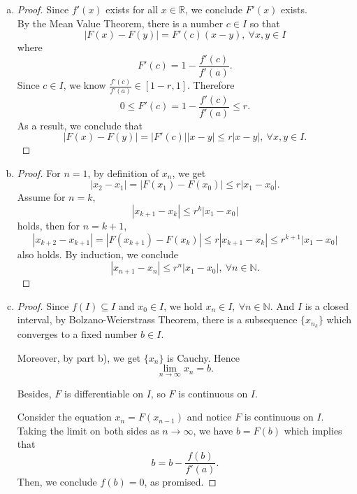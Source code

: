 \begin{Exercise}
\begin{enumerate}[a)]
\item 
\begin{proof}
Since $f'(x)$ exists for all $x \in \mathbb{R}$, we conclude $F'(x)$ exists. \\
By the Mean Value Theorem, there is a number $c \in I$ so that $$ |F(x)-F(y)| = F'(c)(x-y),\ \forall x,y \in I$$
where $$F'(c) = 1-\frac{f'(c)}{f'(a)}.$$
Since $c \in I$, we know $\frac{f'(c)}{f'(a)} \in [1-r,1]$. Therefore $$ 0 \leq F'(c) = 1-\frac{f'(c)}{f'(a)} \leq r.$$
As a result, we conclude that $$|F(x)-F(y)| = |F'(c)||x-y| \leq r|x-y|,\ \forall x,y \in I. $$
\end{proof}

\item
\begin{proof}
For $n=1$, by definition of $x_n$, we get $$|x_2-x_1| = |F(x_1)-F(x_0)| \leq r|x_1-x_0|.$$
Assume for $n=k$, $$|x_{k+1}-x_{k}| \leq r^k|x_1-x_0|$$ holds, then for $n=k+1$, $$|x_{k+2}-x_{k+1}| = |F(x_{k+1})-F(x_{k})| \leq r|x_{k+1}-x_{k}| \leq r^{k+1}|x_1-x_0|$$ also holds.
By induction, we conclude $$|x_{n+1}-x_{n}| \leq r^n|x_1-x_0|,\ \forall n \in \mathbb{N}.$$
\end{proof}

\item 
\begin{proof}
Since $f(I) \subseteq I$ and $x_0 \in I$, we hold $x_n \in I,\ \forall n \in \mathbb{N}$. And $I$ is a closed interval, by Bolzano-Weierstrass Theorem, there is a subsequence $\{x_{n_k}\}$ which converges to a fixed number $b \in I$.

\vspace{1ex}

Moreover, by part b), we get $ \{x_n\}$  is Cauchy. Hence $$\lim_{n\to\infty} x_n = b. $$

Besides, $F$ is differentiable on $I$, so $F$ is continuous on $I$.

\vspace{1ex}

Consider the equation $x_n = F(x_{n-1})$ and notice $F$ is continuous on $I$. Taking the limit on both sides as $n\to\infty$, we have $b=F(b)$ which implies that $$b=b-\frac{f(b)}{f'(a)}.$$
Then, we conclude $f(b)=0$, as promised.
\end{proof}
\end{enumerate}
\end{Exercise}